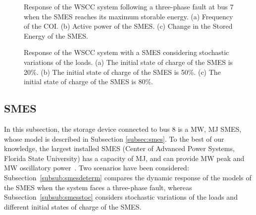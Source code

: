 \documentclass[journal, a4paper]{IEEEtran}
\begin{document}
\begin{figure}[t!]
  \centering
  \vspace{-2.5mm}
  \caption{Response of the WSCC system following a three-phase fault at
    bus 7 when the SMES reaches its maximum storable energy. (a)
    Frequency of the COI. (b) Active power of the SMES. 
    (c) Change in the Stored Energy of the SMES.}
  \label{SMES_Sat}
\vspace{-0.4cm}
\end{figure}
\newpage
\begin{figure*}[t!]
  \centering
  \caption{Response  of  the  WSCC  system  with  a  SMES  considering
    stochastic variations of the loads.
    (a) The initial state of charge of the SMES is 20\%.
    (b) The initial state of charge of the SMES is 50\%.
    (c) The initial state of charge of the SMES is 80\%.}
  \label{SMES_Stoc}
\vspace{-0.4cm}
\end{figure*}

\subsection{SMES}
\label{subsec:smesTDS}

In this subsection, the storage device connected to bus 8 is a 
MW,  MJ SMES, whose model is described in Subsection
\ref{subsec:smes}.  To the best of our knowledge, the largest
  installed SMES (Center of Advanced Power Systems, Florida State
  University) has a capacity of  MJ, and can provide  MW
  peak and  MW oscillatory power~\cite{luongo:03}. 
Two scenarios have been considered: Subsection~\ref{subsub:smesdeterm}
compares the dynamic response of the models of the SMES when the system faces a 
three-phase fault, whereas Subsection~\ref{subsub:smesstoc} considers
stochastic variations of the loads and different initial states of charge of the SMES.
\end{document}
